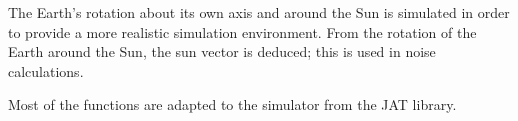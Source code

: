 The Earth's rotation about its own axis and around the Sun is simulated in order to provide a more realistic simulation environment. From the rotation of the Earth around the Sun, the sun vector is deduced; this is used in noise calculations.

Most of the functions are adapted to the simulator from the \ac{JAT} library. 